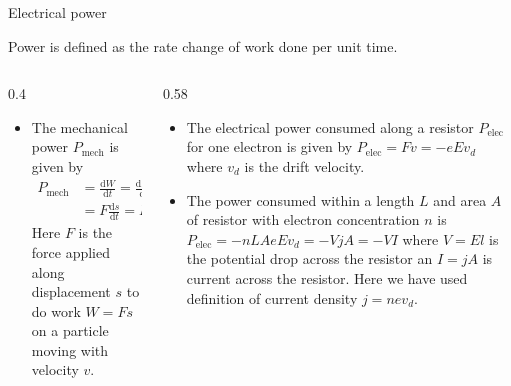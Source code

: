 %
\begin{frame}{Electrical power}
	\begin{definition}
		Power is defined as the rate change of work done per unit time.
	\end{definition}
	\vspace{-1em}
\begin{columns}
	\begin{column}[t]{0.4\textwidth}
		\begin{itemize}
			\item The mechanical power \(P_\text{mech}\) is given by
			\begin{align*}
				P_\text{mech} &= \frac{\mathrm{d}W}{\mathrm{d}t} = \frac{\mathrm{d}F s}{\mathrm{d}t}, \\
				&= F \frac{\mathrm{d}s}{\mathrm{d}t}= 	Fv.
			\end{align*}
			Here \(F\) is the force applied along displacement \(s\) to do work \(W=Fs\) on a particle moving with velocity \(v\).
		\end{itemize}
	\end{column}
	\begin{column}[t]{0.58\textwidth}
		\begin{itemize}
			\item The electrical power consumed along a resistor \(P_\text{elec}\) for one electron is given by
			\( 
			P_\text{elec} = Fv = -eE v_d 
			\)
			where \(v_d\) is the drift velocity.
			\item The power consumed within a length \(L\) and area \(A\) of resistor with electron concentration \(n\) is
			\(
			P_\text{elec} = -nLA e E v_d = -V jA = -VI
			\)
			where \(V=El\) is the potential drop across the resistor an \(I=jA\) is current across the resistor. Here we have used definition of current density \(j=nev_d\).
		\end{itemize}
	\end{column}
\end{columns}
\end{frame}
%

